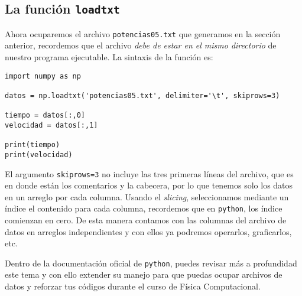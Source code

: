 \documentclass[12pt]{article}
\newcommand{\python}{\texttt{python}}
\begin{document}
{\subsection{La función \texttt{loadtxt}}
Ahora ocuparemos el archivo \texttt{potencias05.txt} que generamos en la sección anterior, recordemos que el archivo \emph{debe de estar en el mismo directorio} de nuestro programa ejecutable. La sintaxis de la función es:
\begin{verbatim}
import numpy as np

datos = np.loadtxt('potencias05.txt', delimiter='\t', skiprows=3)

tiempo = datos[:,0]
velocidad = datos[:,1]

print(tiempo)
print(velocidad)
\end{verbatim}
El argumento \texttt{skiprows=3} no incluye las tres primeras líneas del archivo, que es en donde están los comentarios y la cabecera, por lo que tenemos solo los datos en un arreglo por cada columna. Usando el \emph{slicing}, seleccionamos mediante un índice el contenido para cada columna, recordemos que en \python, los índice comienzan en cero. De esta manera contamos con las columnas del archivo de datos en arreglos independientes y con ellos ya podremos operarlos, graficarlos, etc.
\par
Dentro de la documentación oficial de \python, puedes revisar más a profundidad este tema y con ello extender su manejo para que puedas ocupar archivos de datos y reforzar tus códigos durante el curso de Física Computacional.






    
}
\end{document}
